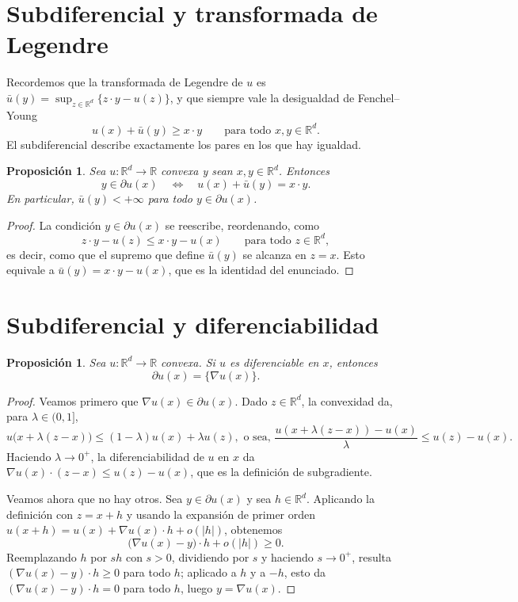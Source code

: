 \documentclass[12pt, a4paper]{amsbook}
\newcommand{\R}{{\mathbb R}}
\newtheorem{prop}[teo]{Proposición}
\theoremstyle{remark}
\theoremstyle{definition}
\numberwithin{section}{chapter}
\numberwithin{subsection}{section}
\numberwithin{equation}{section}
\numberwithin{figure}{chapter}
\begin{document}
\section{Subdiferencial y transformada de Legendre}

Recordemos que la transformada de Legendre de $u$ es
$\bar u(y)=\sup_{z\in\R^d}\{z\cdot y-u(z)\}$, y que siempre vale la
desigualdad de Fenchel--Young
\[
u(x)+\bar u(y)\ge x\cdot y
\qquad\text{para todo }x,y\in\R^d.
\]
El subdiferencial describe exactamente los pares en los que hay igualdad.

\begin{prop}\label{prop.subdiferencial.legendre}
Sea $u\colon\R^d\to\R$ convexa y sean $x,y\in\R^d$. Entonces
\[
y\in\partial u(x)
\quad\Longleftrightarrow\quad
u(x)+\bar u(y)=x\cdot y.
\]
En particular, $\bar u(y)<+\infty$ para todo $y\in\partial u(x)$.
\end{prop}

\begin{proof}
La condición $y\in\partial u(x)$ se reescribe, reordenando, como
\[
z\cdot y-u(z)\le x\cdot y-u(x)
\qquad\text{para todo }z\in\R^d,
\]
es decir, como que el supremo que define $\bar u(y)$ se alcanza en $z=x$.
Esto equivale a $\bar u(y)=x\cdot y-u(x)$, que es la identidad del enunciado.
\end{proof}

\section{Subdiferencial y diferenciabilidad}

\begin{prop}\label{prop.subdiferencial.gradiente}
Sea $u\colon\R^d\to\R$ convexa. Si $u$ es diferenciable en $x$, entonces
\[
\partial u(x)=\{\nabla u(x)\}.
\]
\end{prop}

\begin{proof}
Veamos primero que $\nabla u(x)\in\partial u(x)$. Dado $z\in\R^d$, la
convexidad da, para $\lambda\in(0,1]$,
\[
u\bigl(x+\lambda(z-x)\bigr)\le(1-\lambda)u(x)+\lambda u(z),
\text{ o sea, }
\frac{u(x+\lambda(z-x))-u(x)}{\lambda}\le u(z)-u(x).
\]
Haciendo $\lambda\to0^+$, la diferenciabilidad de $u$ en $x$ da
$\nabla u(x)\cdot(z-x)\le u(z)-u(x)$, que es la definición de subgradiente.

Veamos ahora que no hay otros. Sea $y\in\partial u(x)$ y sea $h\in\R^d$.
Aplicando la definición con $z=x+h$ y usando la expansión de primer orden
$u(x+h)=u(x)+\nabla u(x)\cdot h+o(|h|)$, obtenemos
\[
\bigl(\nabla u(x)-y\bigr)\cdot h+o(|h|)\ge0.
\]
Reemplazando $h$ por $sh$ con $s>0$, dividiendo por $s$ y haciendo $s\to0^+$,
resulta $(\nabla u(x)-y)\cdot h\ge0$ para todo $h$; aplicado a $h$ y a $-h$,
esto da $(\nabla u(x)-y)\cdot h=0$ para todo $h$, luego $y=\nabla u(x)$.
\end{proof}
\end{document}
